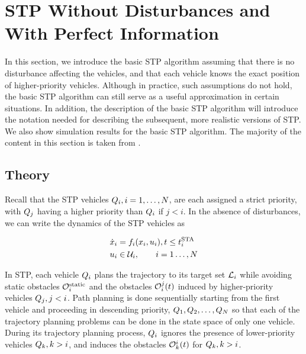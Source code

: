 \section{STP Without Disturbances and With Perfect Information\label{sec:basic}}
In this section, we introduce the basic STP algorithm assuming that there is no disturbance affecting the vehicles, and that each vehicle knows the exact position of higher-priority vehicles. Although in practice, such assumptions do not hold, the basic STP algorithm can still serve as a useful approximation in certain situations. In addition, the description of the basic STP algorithm will introduce the notation needed for describing the subsequent, more realistic versions of STP. We also show simulation results for the basic STP algorithm. The majority of the content in this section is taken from \cite{Chen15c}.

\subsection{Theory}
Recall that the STP vehicles $Q_i, i=1,\ldots,N$, are each assigned a strict priority, with $Q_j$ having a higher priority than $Q_i$ if $j<i$. In the absence of disturbances, we can write the dynamics of the STP vehicles as

\begin{equation}
\label{eq:dyn_no_dstb}
\begin{aligned}
\dot\state_i &= \fdyn_i(\state_i, \ctrl_i), t \le \sta_i \\
\ctrl_i &\in \cset_i, \qquad i = 1 \ldots, \N
\end{aligned}
\end{equation}


In STP, each vehicle $Q_i$ plans the trajectory to its target set $\mathcal{L}_i$ while avoiding static obstacles $\mathcal{O}^\text{static}_i$ and the obstacles $\mathcal{O}_i^j(t)$ induced by higher-priority vehicles $Q_j, j<i$. Path planning is done sequentially starting from the first vehicle and proceeding in descending priority, $Q_1, Q_2, \ldots, Q_{N}$ so that each of the trajectory planning problems can be done in the state space of only one vehicle. During its trajectory planning process, $Q_i$ ignores the presence of lower-priority vehicles $Q_k, k>i$, and induces the obstacles $\mathcal{O}_k^i(t)$ for $Q_k, k>i$.


